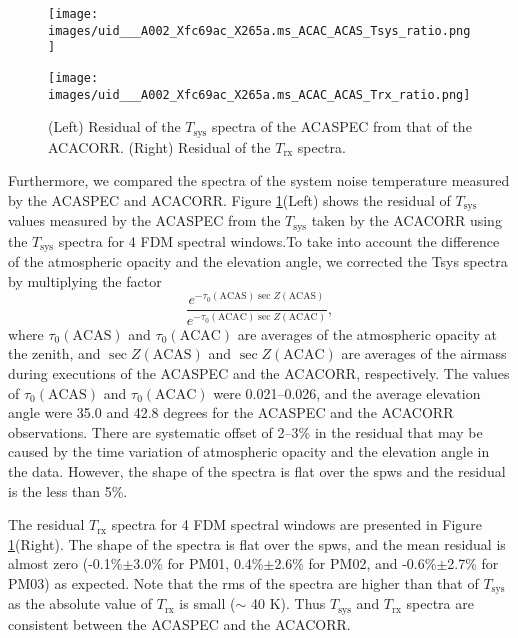 \begin{figure}[htbp]
  \begin{minipage}[b]{0.45\linewidth}
    \centering
    \texttt{[image: images/uid\_\_\_A002\_Xfc69ac\_X265a.ms\_ACAC\_ACAS\_Tsys\_ratio.png]}
  \end{minipage}
  \begin{minipage}[b]{0.45\linewidth}
    \centering
    \texttt{[image: images/uid\_\_\_A002\_Xfc69ac\_X265a.ms\_ACAC\_ACAS\_Trx\_ratio.png]}
  \end{minipage}
    \caption{(Left) Residual of the $T_{\mathrm{sys}}$ spectra of the ACASPEC from that of the ACACORR. (Right) Residual of the $T_{\mathrm{rx}}$ spectra.}
    \label{fig:Linearity}
\end{figure}

Furthermore, we compared the spectra of the system noise temperature measured by the ACASPEC and ACACORR. Figure \ref{fig:Linearity}(Left) shows the residual of $T_{\mathrm{sys}}$ values measured by the ACASPEC from the $T_{\mathrm{sys}}$ taken by the ACACORR using the $T_{\mathrm{sys}}$ spectra for 4 FDM spectral windows.To take into account the difference of the atmospheric opacity and the elevation angle, we corrected the Tsys spectra by multiplying the factor 
\begin{equation}
\frac{e^{-\tau_0(\mathrm{ACAS}) \sec{Z(\mathrm{ACAS})}}}{e^{-\tau_0(\mathrm{ACAC}) \sec{Z(\mathrm{ACAC})}}},
\end{equation}
where $\tau_0{\mathrm{(ACAS)}}$ and $\tau_0(\mathrm{ACAC})$ are averages of the atmospheric opacity at the zenith, and $\sec{Z(\mathrm{ACAS})}$ and $\sec{Z(\mathrm{ACAC})}$ are averages of the airmass during executions of the ACASPEC and the ACACORR, respectively. The values of  $\tau_0{\mathrm{(ACAS)}}$ and $\tau_0(\mathrm{ACAC})$ were 0.021--0.026, and the average elevation angle were 35.0 and 42.8 degrees for the ACASPEC and the ACACORR observations. There are systematic offset of 2--3\% in the residual that may be caused by the time variation of atmospheric opacity and the elevation angle in the data. However, the shape of the spectra is flat over the spws and the residual is the less than 5\%. 

The residual $T_{\mathrm{rx}}$ spectra for 4 FDM spectral windows are presented in Figure \ref{fig:Linearity}(Right). The shape of the spectra is flat over the spws, and the mean residual is almost zero (-0.1\%$\pm$3.0\% for PM01, 0.4\%$\pm$2.6\% for PM02, and -0.6\%$\pm$2.7\% for PM03) as expected.
Note that the rms of the spectra are higher than that of $T_{\mathrm{sys}}$ as the absolute value of $T_{\mathrm{rx}}$ is small ($\sim$ 40 K). Thus $T_{\mathrm{sys}}$ and $T_{\mathrm{rx}}$ spectra are consistent between the ACASPEC and the ACACORR. 


